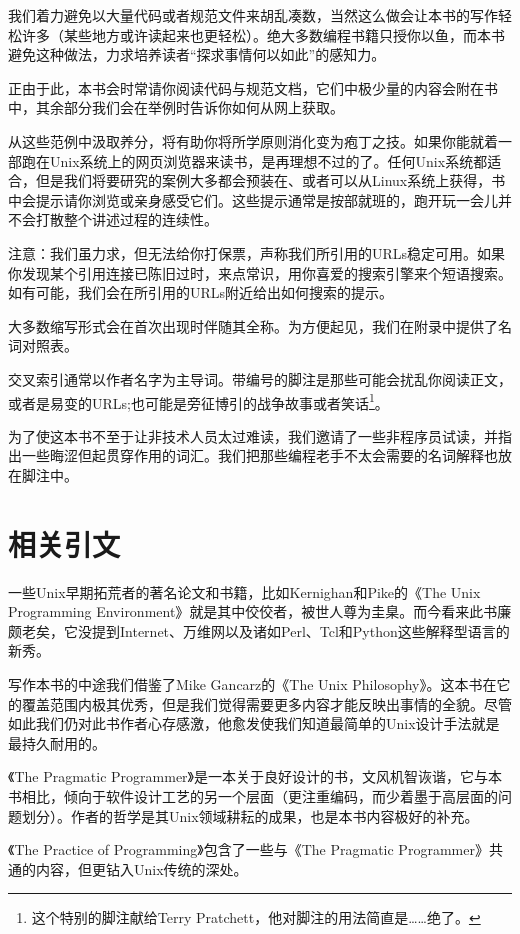\documentclass[12pt,oneside]{book}
\begin{document}
我们着力避免以大量代码或者规范文件来胡乱凑数，当然这么做会让本书的写作轻松许多（某些地方或许读起来也更轻松）。绝大多数编程书籍只授你以鱼，而本书避免这种做法，力求培养读者“探求事情何以如此”的感知力。

正由于此，本书会时常请你阅读代码与规范文档，它们中极少量的内容会附在书中，其余部分我们会在举例时告诉你如何从网上获取。

从这些范例中汲取养分，将有助你将所学原则消化变为疱丁之技。如果你能就着一部跑在Unix系统上的网页浏览器来读书，是再理想不过的了。任何Unix系统都适合，但是我们将要研究的案例大多都会预装在、或者可以从Linux系统上获得，书中会提示请你浏览或亲身感受它们。这些提示通常是按部就班的，跑开玩一会儿并不会打散整个讲述过程的连续性。

注意：我们虽力求，但无法给你打保票，声称我们所引用的URLs稳定可用。如果你发现某个引用连接已陈旧过时，来点常识，用你喜爱的搜索引擎来个短语搜索。如有可能，我们会在所引用的URLs附近给出如何搜索的提示。

大多数缩写形式会在首次出现时伴随其全称。为方便起见，我们在附录中提供了名词对照表。

交叉索引通常以作者名字为主导词。带编号的脚注是那些可能会扰乱你阅读正文，或者是易变的URLs;也可能是旁征博引的战争故事或者笑话\footnote{这个特别的脚注献给Terry Pratchett，他对脚注的用法简直是……绝了。}。

为了使这本书不至于让非技术人员太过难读，我们邀请了一些非程序员试读，并指出一些晦涩但起贯穿作用的词汇。我们把那些编程老手不太会需要的名词解释也放在脚注中。

\section{相关引文}
一些Unix早期拓荒者的著名论文和书籍，比如Kernighan和Pike的《The Unix Programming Environment》\cite{Kernighan-Pike84}就是其中佼佼者，被世人尊为圭臬。而今看来此书廉颇老矣，它没提到Internet、万维网以及诸如Perl、Tcl和Python这些解释型语言的新秀。

写作本书的中途我们借鉴了Mike Gancarz的《The Unix Philosophy》\cite{Gancarz}。这本书在它的覆盖范围内极其优秀，但是我们觉得需要更多内容才能反映出事情的全貌。尽管如此我们仍对此书作者心存感激，他愈发使我们知道最简单的Unix设计手法就是最持久耐用的。

《The Pragmatic Programmer》\cite{Hunt-Thomas}是一本关于良好设计的书，文风机智诙谐，它与本书相比，倾向于软件设计工艺的另一个层面（更注重编码，而少着墨于高层面的问题划分）。作者的哲学是其Unix领域耕耘的成果，也是本书内容极好的补充。

《The Practice of Programming》\cite{Kernighan-Pike99}包含了一些与《The Pragmatic Programmer》共通的内容，但更钻入Unix传统的深处。
\end{document}
